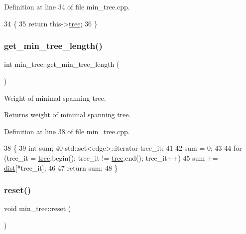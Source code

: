 Definition at line 34 of file min\+\_\+tree.\+cpp.


\begin{DoxyCode}
34                                     \{
35     \textcolor{keywordflow}{return} this->\mbox{\hyperlink{classmin__tree_a138e9248f851ee2562df6644626a1f0b}{tree}};
36 \}
\end{DoxyCode}
\mbox{\label{classmin__tree_a8ca03d32ba55a9eb20b52fcb0e6fa6a5}} 
\subsubsection{\texorpdfstring{get\+\_\+min\+\_\+tree\+\_\+length()}{get\_min\_tree\_length()}}
{\footnotesize\ttfamily int min\+\_\+tree\+::get\+\_\+min\+\_\+tree\+\_\+length (\begin{DoxyParamCaption}{ }\end{DoxyParamCaption})}



Weight of minimal spanning tree. 

\begin{DoxyReturn}{Returns}
weight of minimal spanning tree. 
\end{DoxyReturn}


Definition at line 38 of file min\+\_\+tree.\+cpp.


\begin{DoxyCode}
38                                   \{ 
39     \textcolor{keywordtype}{int} sum;
40     std::set<edge>::iterator tree\_it;
41  
42     sum = 0;
43 
44     \textcolor{keywordflow}{for} (tree\_it = \mbox{\hyperlink{classmin__tree_a138e9248f851ee2562df6644626a1f0b}{tree}}.begin(); tree\_it != \mbox{\hyperlink{classmin__tree_a138e9248f851ee2562df6644626a1f0b}{tree}}.end(); tree\_it++)
45     sum += \mbox{\hyperlink{classmin__tree_ae612767aa8e3eb3bedd1dadd7c68f99c}{dist}}[*tree\_it];
46 
47     \textcolor{keywordflow}{return} sum;
48 \}
\end{DoxyCode}
\mbox{\label{classmin__tree_a0edbe612424dc5f4de4701b8fd0df931}} 
\subsubsection{\texorpdfstring{reset()}{reset()}}
{\footnotesize\ttfamily void min\+\_\+tree\+::reset (\begin{DoxyParamCaption}{ }\end{DoxyParamCaption})\hspace{0.3cm}{\ttfamily [virtual]}}



